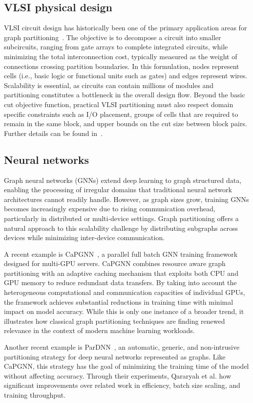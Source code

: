\subsection{VLSI physical design}
VLSI circuit design has historically been one of the primary application areas for graph partitioning~\cite{buluc_recent_2016}. The objective is to decompose a circuit into smaller subcircuits, ranging from gate arrays to complete integrated circuits, while minimizing the total interconnection cost, typically measured as the weight of connections crossing partition boundaries. In this formulation, nodes represent cells (i.e., basic logic or functional units such as gates) and edges represent wires. Scalability is essential, as circuits can contain millions of modules and partitioning constitutes a bottleneck in the overall design flow. Beyond the basic cut objective function, practical VLSI partitioning must also respect domain specific constraints such as I/O placement, groups of cells that are required to remain in the same block, and upper bounds on the cut size between block pairs. Further details can be found in~\cite{kahng_vlsi_2011, cong_multilevel_2003}.

\subsection{Neural networks}
Graph neural networks (GNNs) extend deep learning to graph structured data, enabling the processing of irregular domains that traditional neural network architectures cannot readily handle. However, as graph sizes grow, training GNNs becomes increasingly expensive due to rising communication overhead, particularly in distributed or multi-device settings. Graph partitioning offers a natural approach to this scalability challenge by distributing subgraphs across devices while minimizing inter-device communication.

A recent example is CaPGNN~\cite{song_capgnn_2026}, a parallel full batch GNN training framework designed for multi-GPU servers. CaPGNN combines resource aware graph partitioning with an adaptive caching mechanism that exploits both CPU and GPU memory to reduce redundant data transfers. By taking into account the heterogeneous computational and communication capacities of individual GPUs, the framework achieves substantial reductions in training time with minimal impact on model accuracy. While this is only one instance of a broader trend, it illustrates how classical graph partitioning techniques are finding renewed relevance in the context of modern machine learning workloads.

Another recent example is ParDNN~\cite{qararyah_computational-graph_2021}, an automatic, generic, and non-intrusive partitioning strategy for deep neural networks represented as graphs. Like CaPGNN, this strategy has the goal of minimizing the training time of the model without affecting accuracy. Through their experiments, Qararyah et al. how significant improvements over related work in efficiency, batch size scaling, and training throughput.

